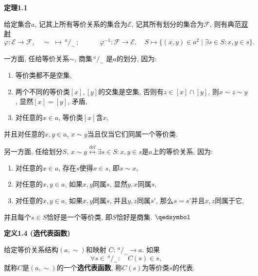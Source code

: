 \documentclass[UTF8]{ctexart}
\begin{document}
\vspace{10pt}

\hypertarget{sec:定理1.1}{}
\noindent\textbf{定理1.1}

给定集合$a$, 记其上所有等价关系的集合为$\mathcal{E}$,
记其所有划分的集合为$\mathcal{F}$, 则有典范\href{03 映射#nameddest=sec:定义2.2}{双射}
\[
    \varphi:\mathcal{E}\to\mathcal{F},\quad\sim\,\,\mapsto
    \,\!^{\displaystyle a}\!/_{\displaystyle\sim}\,;\quad\quad\quad
    \varphi^{-1}:\mathcal{F}\to\mathcal{E},\quad S\mapsto
    \{(x,y)\in a^2\mid\exists s\in S:x,y\in s\}.
\]


一方面, 任给等价关系$\sim$, 商集$\,\!^{\displaystyle a}\!/_{\displaystyle\sim}$
是$a$的划分, 因为:
\begin{enumerate}
    \item 等价类都不是空集,
    \item 两个不同的等价类$[x],[y]$的交集是空集, 否则有$z\in[x]\cap[y]$,
    则$x\sim z\sim y$, 显然$[x]=[y]$, 矛盾,
    \item 对任意的$x\in a$, 等价类$[x]$含$x$,
\end{enumerate}
并且对任意的$x,y\in a$, $x\sim y$当且仅当它们同属一个等价类.

另一方面, 任给划分$S$, $x\sim y\overset{\mathrm{def}}{\leftrightarrow}
\exists s\in S:x,y\in s$是$a$上的等价关系, 因为:
\begin{enumerate}
    \item 对任意的$x\in a$, 存在$s$使得$x\in s$, 即$x\sim x$,
    \item 对任意的$x,y\in a$, 如果$x,y$同属$s$, 显然$y,x$同属$s$,
    \item 对任意的$x,y\in a$, 如果$x,y$同属$s$, 并且$y,z$同属$s'$,
    那么$s=s'$并且$x,z$同属于它,
\end{enumerate}
并且每个$s\in S$恰好是一个等价类, 即$S$恰好是商集. \hfill $\qedsymbol$





\newpage

\hypertarget{sec:定义1.4}{}
\noindent\textbf{定义1.4 (选代表函数)}

给定等价关系结构$(a,\sim)$和映射
$C:\,\!^{\displaystyle a}\!/_{\displaystyle\sim}\to a$. 如果
\[
    \forall s\in\,\!^{\displaystyle a}\!/_{\displaystyle\sim}:\quad C(s)\in s,
\]
就称$C$是$(a,\sim)$的一个\textbf{选代表函数}, 称$C(s)$为等价类$s$的代表.

\vspace{10pt}
\end{document}
